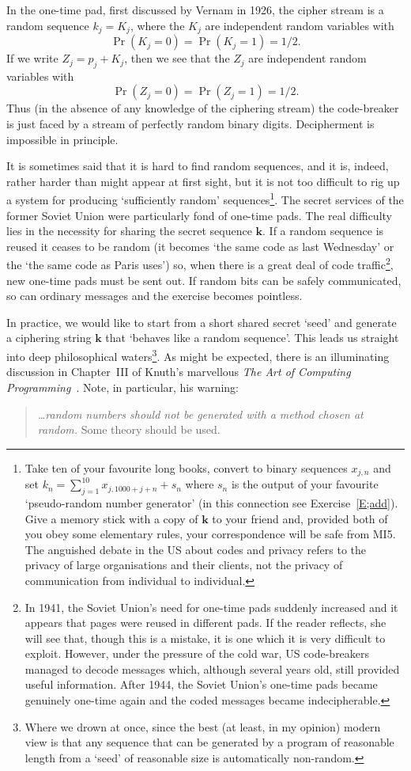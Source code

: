 \documentclass[12pt,a4paper]{article}
\theoremstyle{plain}
\theoremstyle{definition}
\begin{document}
In the one-time pad, first discussed by
Vernam in 1926, the cipher stream is a random
sequence $k_{j}=K_{j}$, where the $K_{j}$ are
independent random variables with
\[\Pr(K_{j}=0)=\Pr(K_{j}=1)=1/2.\]
If we write $Z_{j}=p_{j}+K_{j}$, then we see that
the $Z_{j}$ are
independent random variables with
\[\Pr(Z_{j}=0)=\Pr(Z_{j}=1)=1/2.\]
Thus (in the absence of any knowledge of the ciphering stream)
the code-breaker is just faced by a stream of
perfectly random binary digits. Decipherment
is impossible in principle.

It is sometimes said that it is hard to find
random sequences, and it is, indeed, rather harder
than might appear at first sight, but it is
not too difficult to rig up a system for producing
`sufficiently random' sequences\footnote{Take ten
of your favourite long books, convert to
binary sequences $x_{j,n}$ and set
$k_{n}=\sum_{j=1}^{10}x_{j,1000+j+n}+s_{n}$
where $s_{n}$ is the output of your favourite
`pseudo-random number generator'
(in this connection see Exercise~\ref{E;add}). Give a memory stick
with a copy of ${\mathbf k}$ to your friend
and, provided both of you obey some elementary rules,
your correspondence
will be safe from MI5. The anguished debate in the US
about codes and
privacy refers to the privacy of large organisations
and their clients, not the privacy of communication
from individual to individual.}.
The secret
services of the former Soviet Union were
particularly fond of one-time 
pads. 
The real
difficulty lies in the necessity for sharing
the secret sequence ${\mathbf k}$. If a random sequence
is reused it ceases to be random (it becomes
`the same code as last Wednesday' or the
`the same code as Paris uses') so, when
there is a great deal of code traffic\footnote{In 1941, 
the Soviet Union's
need for one-time pads suddenly
increased and it appears that pages were reused
in different pads. If the reader reflects, she will see that,
though this is a mistake, 
it is one which it is very difficult to exploit.
However, under the pressure of the cold war, US code-breakers
managed to decode messages which, although several years old,
still provided useful information. After 1944, the Soviet Union's
one-time pads became genuinely one-time again and the
coded messages became indecipherable.}, new
one-time pads must be sent out.
If random bits can be safely communicated,
so can ordinary messages and the exercise
becomes pointless.

In practice, we would like to start from a short
shared secret `seed' and generate a ciphering
string ${\mathbf k}$ that `behaves like a random
sequence'. This leads us straight into deep
philosophical waters\footnote{Where we drown
at once, since the best (at least, in
my opinion)
modern view is that any sequence that can be generated
by a program of reasonable length from a `seed'
of reasonable size is automatically non-random.}.
As might be expected, there is an illuminating
discussion in Chapter~III
of Knuth's marvellous \emph{The Art of
Computing Programming}~\cite{Knuth}.
Note, in particular, his warning:
\begin{quote} \emph{\dots random numbers
should not be generated with a method chosen at
random.} Some theory should be used.
\end{quote}
\end{document}
